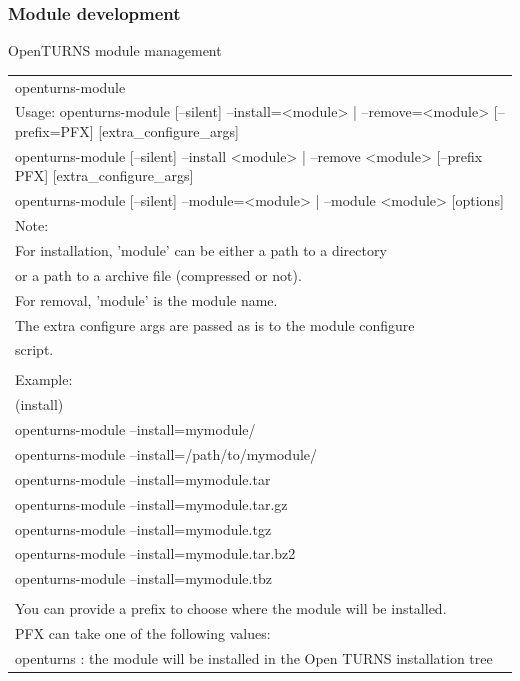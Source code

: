 \documentclass[8pt]{beamer}
\begin{document}
\begin{frame}
  \frametitle{Module development}
  \begin{block}{OpenTURNS module management}
    \scriptsize
    \begin{tabular}{l}
      \ttfamily openturns-module \\
      \ttfamily Usage: openturns-module [--silent] {--install=<module> | --remove=<module>} [--prefix=PFX] [extra\_configure\_args] \\
      \ttfamily openturns-module [--silent] {--install <module> | --remove <module>} [--prefix PFX] [extra\_configure\_args] \\
      \ttfamily  openturns-module [--silent] {--module=<module> | --module <module>} [options] \\
      \ttfamily  Note: \\
      \ttfamily For installation, 'module' can be either a path to a directory \\
      \ttfamily  or a path to a archive file (compressed or not). \\
      \ttfamily For removal, 'module' is the module name. \\
      \ttfamily The extra configure args are passed as is to the module configure \\
      \ttfamily script. \\
      \\
      \ttfamily Example: \\
      \ttfamily (install) \\
      \ttfamily openturns-module --install=mymodule/ \\
      \ttfamily openturns-module --install=/path/to/mymodule/ \\
      \ttfamily openturns-module --install=mymodule.tar \\
      \ttfamily openturns-module --install=mymodule.tar.gz \\
      \ttfamily openturns-module --install=mymodule.tgz \\
      \ttfamily openturns-module --install=mymodule.tar.bz2 \\
      \ttfamily openturns-module --install=mymodule.tbz \\
      \\
      \ttfamily You can provide a prefix to choose where the module will be installed. \\
      \ttfamily PFX can take one of the following values: \\
      \ttfamily * openturns : the module will be installed in the Open TURNS installation tree
    \end{tabular}
  \end{block}
\end{frame}
\end{document}
